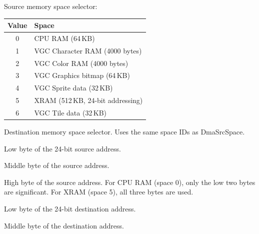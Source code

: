 

Source memory space selector:

\begin{center}
\small
\begin{tabular}{@{}cl@{}}
\toprule
\textbf{Value} & \textbf{Space} \\
\midrule
0 & CPU RAM (64\,KB) \\
1 & VGC Character RAM (4000 bytes) \\
2 & VGC Color RAM (4000 bytes) \\
3 & VGC Graphics bitmap (64\,KB) \\
4 & VGC Sprite data (32\,KB) \\
5 & XRAM (512\,KB, 24-bit addressing) \\
6 & VGC Tile data (32\,KB) \\
\bottomrule
\end{tabular}
\end{center}



Destination memory space selector.  Uses the same space IDs as DmaSrcSpace.



Low byte of the 24-bit source address.


Middle byte of the source address.


High byte of the source address.  For CPU RAM (space 0), only the low two
bytes are significant.  For XRAM (space 5), all three bytes are used.



Low byte of the 24-bit destination address.


Middle byte of the destination address.


